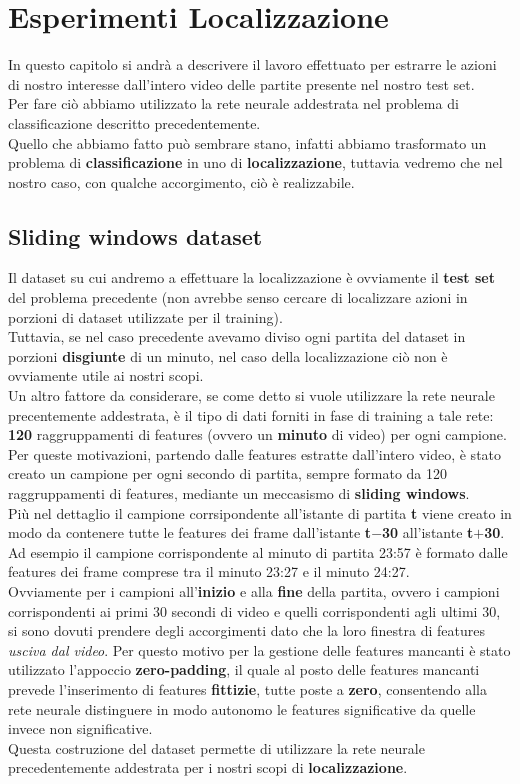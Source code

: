 \chapter{Esperimenti Localizzazione}\label{ch:chapter3}
In questo capitolo si andrà a descrivere il lavoro effettuato per estrarre le azioni di nostro interesse dall'intero video delle partite presente nel nostro test set.
\\Per fare ciò abbiamo utilizzato la rete neurale addestrata nel problema di classificazione descritto precedentemente.
\\Quello che abbiamo fatto  può sembrare stano, infatti abbiamo trasformato un problema di \textbf{classificazione} in uno di \textbf{localizzazione}, tuttavia vedremo che nel nostro caso, con qualche accorgimento, ciò è realizzabile.
\section{Sliding windows dataset}
Il dataset su cui andremo a effettuare la localizzazione è ovviamente il \textbf{test set} del problema precedente (non avrebbe senso cercare di localizzare azioni in porzioni di dataset utilizzate per il training).
\\Tuttavia, se nel caso precedente avevamo diviso ogni partita del dataset in porzioni \textbf{disgiunte} di un minuto, nel caso della localizzazione ciò non è ovviamente utile ai nostri scopi.
\\Un altro fattore da considerare, se come detto si vuole utilizzare la rete neurale precentemente addestrata, è  il tipo di dati forniti in fase di training a tale rete: \textbf{120} raggruppamenti di features (ovvero un \textbf{minuto} di video) per ogni campione.
\\Per queste motivazioni, partendo dalle features estratte dall'intero video, è stato creato un campione per ogni secondo di partita, sempre formato da 120 raggruppamenti di features, mediante un meccasismo di \textbf{sliding windows}.
\\Più nel dettaglio il campione corrsipondente all'istante di partita \textbf{t} viene creato in modo da contenere tutte le features dei frame dall'istante \textbf{t$-$30} all'istante \textbf{t$+$30}.
\\Ad esempio il campione corrispondente al minuto di partita 23:57 è formato dalle features dei frame comprese tra il minuto 23:27 e il minuto  24:27.
\\Ovviamente per i campioni all'\textbf{inizio} e alla \textbf{fine} della partita, ovvero i campioni corrispondenti ai primi 30 secondi di video e quelli corrispondenti agli ultimi 30, si sono dovuti prendere degli accorgimenti dato che la loro finestra di features \textit{usciva dal video}. Per questo motivo per la gestione delle features mancanti è stato utilizzato l'appoccio \textbf{zero-padding}, il quale al posto delle features mancanti prevede l'inserimento di features \textbf{fittizie}, tutte poste a \textbf{zero}, consentendo alla rete neurale distinguere in modo autonomo le features significative da quelle invece non significative.
\\Questa costruzione del dataset permette di utilizzare la rete neurale precedentemente addestrata per i nostri scopi di \textbf{localizzazione}.
